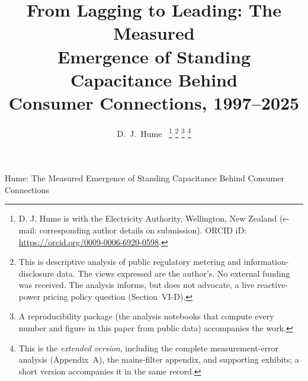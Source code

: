 \documentclass[journal]{IEEEtran}
\begin{document}
\title{From Lagging to Leading: The Measured\\
Emergence of Standing Capacitance Behind\\ Consumer Connections, 1997--2025}

\author{D.~J.~Hume~%
\thanks{D. J. Hume is with the Electricity Authority, Wellington, New Zealand
(e-mail: corresponding author details on submission).
ORCID iD: \url{https://orcid.org/0009-0006-6920-0598}.}%
\thanks{This is descriptive analysis of public regulatory metering and
information-disclosure data. The views expressed are the author's. No external
funding was received. The analysis informs, but does not advocate, a live
reactive-power pricing policy question (Section~VI-D).}%
\thanks{A reproducibility package (the analysis notebooks that compute every
number and figure in this paper from public data) accompanies the work.}%
\thanks{This is the \emph{extended version}, including the complete
measurement-error analysis (Appendix~A), the mains-filter appendix, and
supporting exhibits; a short version accompanies it in the same record.}}

%
{Hume: The Measured Emergence of Standing Capacitance Behind Consumer Connections}

\maketitle
\end{document}
